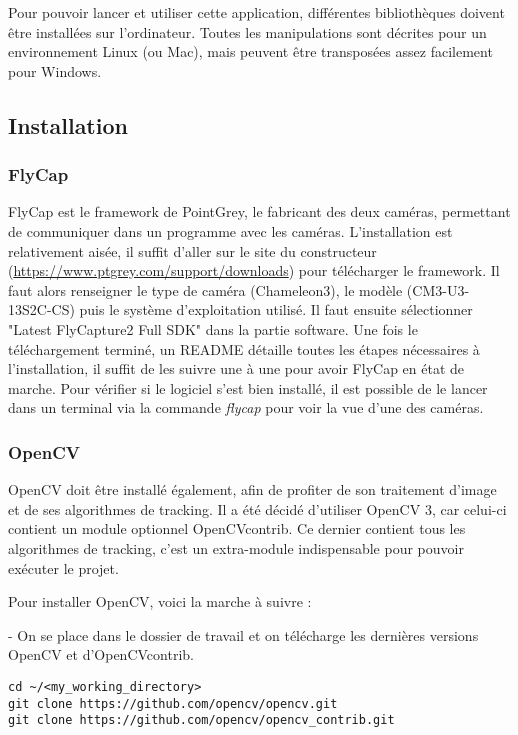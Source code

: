 Pour pouvoir lancer et utiliser cette application, différentes bibliothèques doivent être installées sur l'ordinateur. Toutes les manipulations sont décrites pour un environnement Linux (ou Mac), mais peuvent être transposées assez facilement pour Windows.

\subsection{Installation}

\subsubsection{FlyCap}

FlyCap est le framework de PointGrey, le fabricant des deux caméras, permettant de communiquer dans un programme avec les caméras. L'installation est relativement aisée, il suffit d'aller sur le site du constructeur (\url{https://www.ptgrey.com/support/downloads}) pour télécharger le framework. Il faut alors renseigner le type de caméra (Chameleon3), le modèle (CM3-U3-13S2C-CS) puis le système d'exploitation utilisé. Il faut ensuite sélectionner "Latest FlyCapture2 Full SDK" dans la partie software. Une fois le téléchargement terminé, un README détaille toutes les étapes nécessaires à l'installation, il suffit de les suivre une à une pour avoir FlyCap en état de marche. Pour vérifier si le logiciel s'est bien installé, il est possible de le lancer dans un terminal via la commande \textit{flycap} pour voir la vue d'une des caméras.

\subsubsection{OpenCV}

OpenCV doit être installé également, afin de profiter de son traitement d'image et de ses algorithmes de tracking. Il a été décidé d'utiliser OpenCV 3, car celui-ci contient un module optionnel OpenCV\textunderscore contrib. Ce dernier contient tous les algorithmes de tracking, c'est un extra-module indispensable pour pouvoir exécuter le projet.

Pour installer OpenCV, voici la marche à suivre :

- On se place dans le dossier de travail et on télécharge les dernières versions OpenCV  et d'OpenCV\textunderscore contrib.

\begin{verbatim}
cd ~/<my_working_directory>
git clone https://github.com/opencv/opencv.git
git clone https://github.com/opencv/opencv_contrib.git
\end{verbatim}

